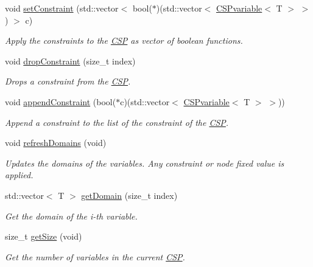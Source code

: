 \begin{DoxyCompactItemize}
void \hyperlink{classCSP_a457e1df05d4ec16be00118bda22fd882}{setConstraint} (std::vector$<$ bool($\ast$)(std::vector$<$ \hyperlink{structCSPvariable}{CSPvariable}$<$ T $>$ $>$) $>$ c)
\begin{DoxyCompactList}\small\item\em Apply the constraints to the \hyperlink{classCSP}{CSP} as vector of boolean functions. \item\end{DoxyCompactList}\item 
void \hyperlink{classCSP_a0231b93bceae257f0e1c35041f8fe63f}{dropConstraint} (size\_\-t index)
\begin{DoxyCompactList}\small\item\em Drops a constraint from the \hyperlink{classCSP}{CSP}. \item\end{DoxyCompactList}\item 
void \hyperlink{classCSP_a8dc6aec6ca7e40d198e58b0ec14fee66}{appendConstraint} (bool($\ast$c)(std::vector$<$ \hyperlink{structCSPvariable}{CSPvariable}$<$ T $>$ $>$))
\begin{DoxyCompactList}\small\item\em Append a constraint to the list of the constraint of the \hyperlink{classCSP}{CSP}. \item\end{DoxyCompactList}\item 
void \hyperlink{classCSP_a466845256e638c5e258fd728b641359f}{refreshDomains} (void)
\begin{DoxyCompactList}\small\item\em Updates the domains of the variables. Any constraint or node fixed value is applied. \item\end{DoxyCompactList}\item 
std::vector$<$ T $>$ \hyperlink{classCSP_a2a9a7d8072613f6984795d5495373847}{getDomain} (size\_\-t index)
\begin{DoxyCompactList}\small\item\em Get the domain of the i-\/th variable. \item\end{DoxyCompactList}\item 
size\_\-t \hyperlink{classCSP_a91a0e89bc1882d39b88122bee392c5f3}{getSize} (void)
\begin{DoxyCompactList}\small\item\em Get the number of variables in the current \hyperlink{classCSP}{CSP}. \item\end{DoxyCompactList}\item 

\end{DoxyCompactItemize}
